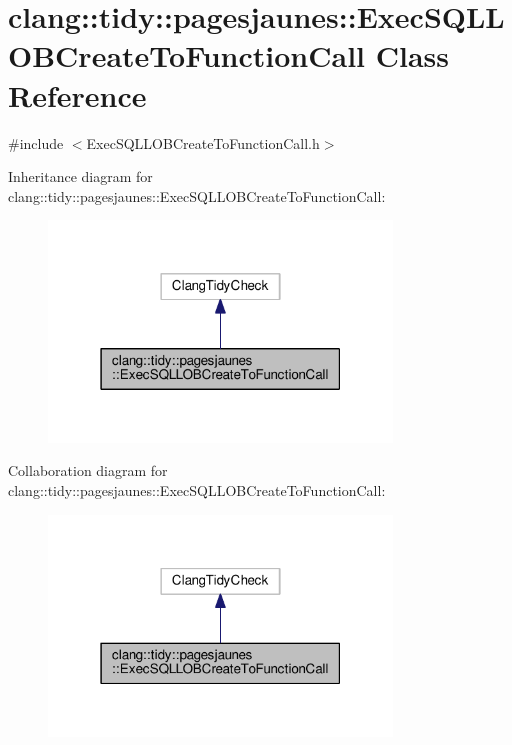 \hypertarget{classclang_1_1tidy_1_1pagesjaunes_1_1_exec_s_q_l_l_o_b_create_to_function_call}{}\section{clang\+:\+:tidy\+:\+:pagesjaunes\+:\+:Exec\+S\+Q\+L\+L\+O\+B\+Create\+To\+Function\+Call Class Reference}
\label{classclang_1_1tidy_1_1pagesjaunes_1_1_exec_s_q_l_l_o_b_create_to_function_call}


{\ttfamily \#include $<$Exec\+S\+Q\+L\+L\+O\+B\+Create\+To\+Function\+Call.\+h$>$}



Inheritance diagram for clang\+:\+:tidy\+:\+:pagesjaunes\+:\+:Exec\+S\+Q\+L\+L\+O\+B\+Create\+To\+Function\+Call\+:
\nopagebreak
\begin{figure}[H]
\begin{center}
\leavevmode
\includegraphics[width=259pt]{classclang_1_1tidy_1_1pagesjaunes_1_1_exec_s_q_l_l_o_b_create_to_function_call__inherit__graph}
\end{center}
\end{figure}


Collaboration diagram for clang\+:\+:tidy\+:\+:pagesjaunes\+:\+:Exec\+S\+Q\+L\+L\+O\+B\+Create\+To\+Function\+Call\+:
\nopagebreak
\begin{figure}[H]
\begin{center}
\leavevmode
\includegraphics[width=259pt]{classclang_1_1tidy_1_1pagesjaunes_1_1_exec_s_q_l_l_o_b_create_to_function_call__coll__graph}
\end{center}
\end{figure}
